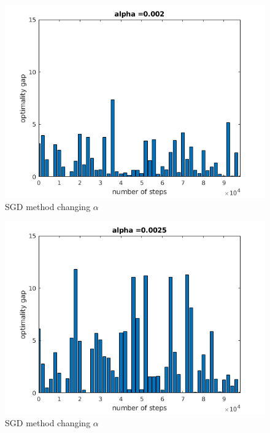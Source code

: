 \documentclass[a4paper, 11pt]{article}
\begin{document}
\begin{figure}[htbp]
\centering
\includegraphics[scale=0.7]{figure/p1_2_4.png}
\caption{SGD method changing $\alpha$}
\label{p1_2_4}
\end{figure}

\begin{figure}[htbp]
\centering
\includegraphics[scale=0.7]{figure/p1_2_5.png}
\caption{SGD method changing $\alpha$}
\label{p1_2_5}
\end{figure}
\end{document}
